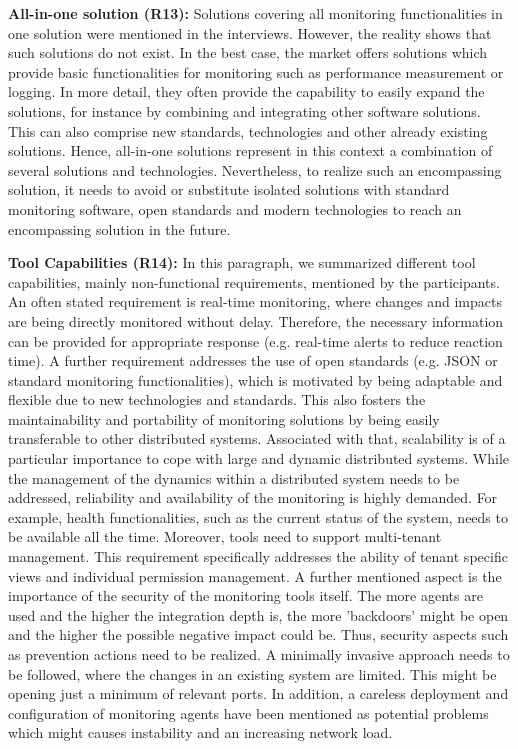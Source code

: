 \documentclass[runningheads]{llncs}
\begin{document}
\textbf{All-in-one solution (R13):} Solutions covering all monitoring functionalities in one solution were mentioned in the interviews. However, the reality shows that such solutions do not exist. In the best case, the market offers solutions which provide basic functionalities for monitoring such as performance measurement or logging. In more detail, they often provide the capability to easily expand the solutions, for instance by combining and integrating other software solutions. This can also comprise new standards, technologies and other already existing solutions. Hence, all-in-one solutions represent in this context a combination of several solutions and technologies. Nevertheless, to realize such an encompassing solution, it needs to avoid or substitute isolated solutions with standard monitoring software, open standards and modern technologies to reach an encompassing solution in the future.

\textbf{Tool Capabilities (R14):} In this paragraph, we summarized different tool capabilities, mainly non-functional requirements, mentioned by the participants. An often stated requirement is real-time monitoring, where changes and impacts are being directly monitored without delay. Therefore, the necessary information can be provided for appropriate response (e.g. real-time alerts to reduce reaction time). A further requirement addresses the use of open standards (e.g. JSON or standard monitoring functionalities), which is motivated by being adaptable and flexible due to new technologies and standards. This also fosters the maintainability and portability of monitoring solutions by being easily transferable to other distributed systems. Associated with that, scalability is of a particular importance to cope with large and dynamic distributed systems. While the management of the dynamics within a distributed system needs to be addressed, reliability and availability of the monitoring is highly demanded. For example, health functionalities, such as the current status of the system, needs to be available all the time. Moreover, tools need to support multi-tenant management. This requirement specifically addresses the ability of tenant specific views and individual permission management. A further mentioned aspect is the importance of the security of the monitoring tools itself. The more agents are used and the higher the integration depth is, the more 'backdoors' might be open and the higher the possible negative impact could be. Thus, security aspects such as prevention actions need to be realized. A minimally invasive approach needs to be followed, where the changes in an existing system are limited. This might be opening just a minimum of relevant ports. In addition, a careless deployment and configuration of monitoring agents have been mentioned as potential problems which might causes instability and an increasing network load. 
\end{document}
